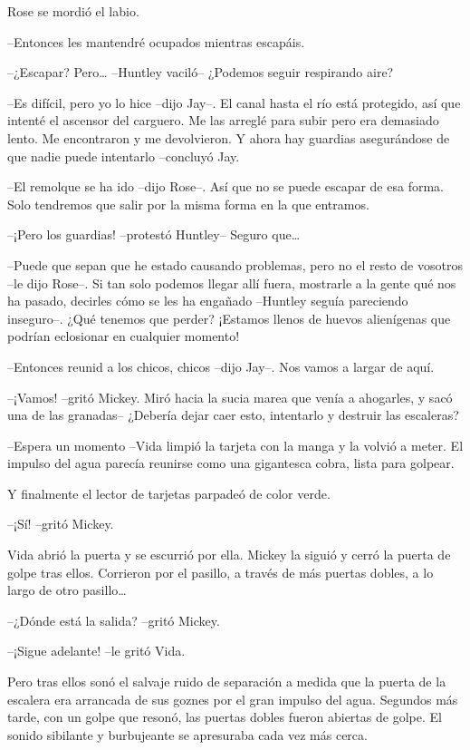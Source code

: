 {Rose se mordió el labio.}

{--Entonces les mantendré ocupados mientras escapáis.}

{--¿Escapar? Pero\ldots{} --Huntley vaciló-- ¿Podemos seguir respirando
aire?}

{--Es difícil, pero yo lo hice --dijo Jay--. El canal hasta el río está
 protegido, así que intenté el ascensor del carguero. Me las arreglé para
 subir pero era demasiado lento. Me encontraron y me devolvieron. Y ahora
hay guardias asegurándose de que nadie puede intentarlo --concluyó Jay.}

{--El remolque se ha ido --dijo Rose--. Así que no se puede escapar de
 esa forma. Solo tendremos que salir por la misma forma en la que
entramos.}

{--¡Pero los guardias! --protestó Huntley-- Seguro que\ldots{}}

{--Puede que sepan que he estado causando problemas, pero no el resto de
 vosotros --le dijo Rose--. Si tan solo podemos llegar allí fuera,
 mostrarle a la gente qué nos ha pasado, decirles cómo se les ha engañado
 --Huntley seguía pareciendo inseguro--. ¿Qué tenemos que perder?
 ¡Estamos llenos de huevos alienígenas que podrían eclosionar en
cualquier momento!}

{--Entonces reunid a los chicos, chicos --dijo Jay--. Nos vamos a largar
de aquí.}

\mbox{}

{--¡Vamos! --gritó Mickey. Miró hacia la sucia marea que venía a
 ahogarles, y sacó una de las granadas-- ¿Debería dejar caer esto,
intentarlo y destruir las escaleras?}

{--Espera un momento --Vida limpió la tarjeta con la manga y la volvió a
 meter. El impulso del agua parecía reunirse como una gigantesca cobra,
lista para golpear.}

{Y finalmente el lector de tarjetas parpadeó de color verde.}

{--¡Sí! --gritó Mickey.}

{Vida abrió la puerta y se escurrió por ella. Mickey la siguió y cerró
 la puerta de golpe tras ellos. Corrieron por el pasillo, a través de más
 puertas dobles, a lo largo de otro pasillo\ldots{}}

{--¿Dónde está la salida? --gritó Mickey.}

{--¡Sigue adelante! --le gritó Vida.}

{Pero tras ellos sonó el salvaje ruido de separación a medida que la
 puerta de la escalera era arrancada de sus goznes por el gran impulso
 del agua. Segundos más tarde, con un golpe que resonó, las puertas
 dobles fueron abiertas de golpe. El sonido sibilante y burbujeante se
apresuraba cada vez más cerca.}

